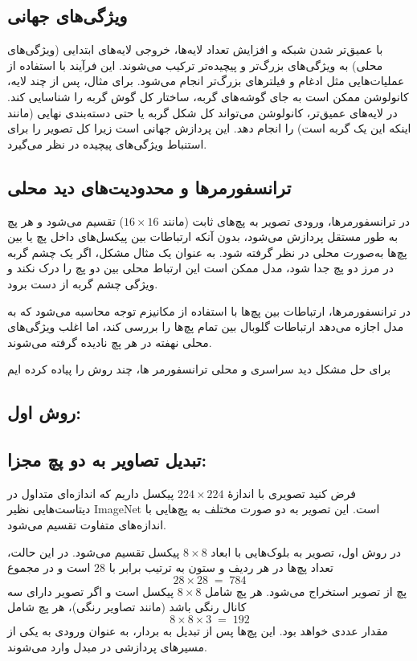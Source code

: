 \subsection{ویژگی‌های جهانی}
با عمیق‌تر شدن شبکه و افزایش تعداد لایه‌ها، خروجی لایه‌های ابتدایی (ویژگی‌های محلی) به ویژگی‌های بزرگ‌تر و پیچیده‌تر ترکیب می‌شوند. این فرآیند با استفاده از عملیات‌هایی مثل ادغام و فیلترهای بزرگ‌تر انجام می‌شود. برای مثال، پس از چند لایه، کانولوشن ممکن است به جای گوشه‌های گربه، ساختار کل گوش گربه را شناسایی کند. در لایه‌های عمیق‌تر، کانولوشن می‌تواند کل شکل گربه یا حتی دسته‌بندی نهایی (مانند اینکه این یک گربه است) را انجام دهد. این پردازش جهانی است زیرا کل تصویر را برای استنباط ویژگی‌های پیچیده در نظر می‌گیرد.

\subsection{ترانسفورمرها و محدودیت‌های دید محلی}
در ترانسفورمرها، ورودی تصویر به پچ‌های ثابت (مانند $16 \times 16$) تقسیم می‌شود و هر پچ به طور مستقل پردازش می‌شود، بدون آنکه ارتباطات بین پیکسل‌های داخل پچ یا بین پچ‌ها به‌صورت محلی در نظر گرفته شود. به عنوان یک مثال مشکل، اگر یک چشم گربه در مرز دو پچ جدا شود، مدل ممکن است این ارتباط محلی بین دو پچ را درک نکند و ویژگی چشم گربه از دست برود. 

در ترانسفورمرها، ارتباطات بین پچ‌ها با استفاده از مکانیزم توجه محاسبه می‌شود که به مدل اجازه می‌دهد ارتباطات گلوبال بین تمام پچ‌ها را بررسی کند، اما اغلب ویژگی‌های محلی نهفته در هر پچ نادیده گرفته می‌شوند.

برای حل مشکل دید سراسری  و محلی ترانسفورمر ها، چند روش را پیاده کرده ایم 

\subsection{روش اول:}

\subsection{تبدیل تصاویر به دو پچ مجزا:}

فرض کنید تصویری با اندازهٔ $224 \times 224$ پیکسل داریم که اندازه‌ای متداول در دیتاست‌هایی نظیر ImageNet است. این تصویر به دو صورت مختلف به پچ‌هایی با اندازه‌های متفاوت تقسیم می‌شود. 

در روش اول، تصویر به بلوک‌هایی با ابعاد $8 \times 8$ پیکسل تقسیم می‌شود. در این حالت، تعداد پچ‌ها در هر ردیف و ستون به ترتیب برابر با  $28$ است و در مجموع 
\[
28 \times 28 \;=\; 784
\]
پچ از تصویر استخراج می‌شود. هر پچ شامل $8 \times 8$ پیکسل است و اگر تصویر دارای سه کانال رنگی باشد (مانند تصاویر رنگی)، هر پچ شامل 
\[
8 \times 8 \times 3 \;=\; 192
\]
مقدار عددی خواهد بود. این پچ‌ها پس از تبدیل به بردار، به عنوان ورودی به یکی از مسیرهای پردازشی در مبدل وارد می‌شوند.

